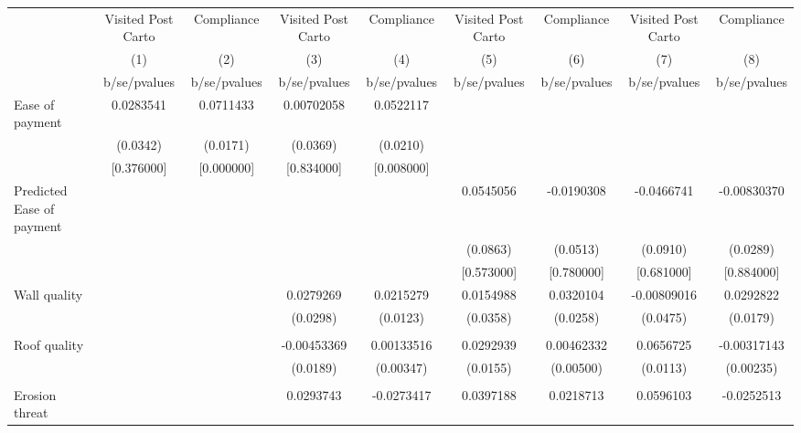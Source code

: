 {
\def\sym#1{\ifmmode^{#1}\else\(^{#1}\)\fi}
\begin{tabular}{l*{8}{c}}
\toprule
                &\multicolumn{1}{c}{Visited Post Carto}&\multicolumn{1}{c}{Compliance}&\multicolumn{1}{c}{Visited Post Carto}&\multicolumn{1}{c}{Compliance}&\multicolumn{1}{c}{Visited Post Carto}&\multicolumn{1}{c}{Compliance}&\multicolumn{1}{c}{Visited Post Carto}&\multicolumn{1}{c}{Compliance}\\
                &\multicolumn{1}{c}{(1)}&\multicolumn{1}{c}{(2)}&\multicolumn{1}{c}{(3)}&\multicolumn{1}{c}{(4)}&\multicolumn{1}{c}{(5)}&\multicolumn{1}{c}{(6)}&\multicolumn{1}{c}{(7)}&\multicolumn{1}{c}{(8)}\\
                &b/se/pvalues&b/se/pvalues&b/se/pvalues&b/se/pvalues&b/se/pvalues&b/se/pvalues&b/se/pvalues&b/se/pvalues\\
\midrule
Ease of payment &0.0283541&0.0711433&0.00702058&0.0522117&         &         &         &         \\
                & (0.0342)& (0.0171)& (0.0369)& (0.0210)&         &         &         &         \\
                &[0.376000]&[0.000000]&[0.834000]&[0.008000]&         &         &         &         \\
Predicted Ease of payment&         &         &         &         &0.0545056&-0.0190308&-0.0466741&-0.00830370\\
                &         &         &         &         & (0.0863)& (0.0513)& (0.0910)& (0.0289)\\
                &         &         &         &         &[0.573000]&[0.780000]&[0.681000]&[0.884000]\\
Wall quality    &         &         &0.0279269&0.0215279&0.0154988&0.0320104&-0.00809016&0.0292822\\
                &         &         & (0.0298)& (0.0123)& (0.0358)& (0.0258)& (0.0475)& (0.0179)\\
                &         &         &         &         &         &         &         &         \\
Roof quality    &         &         &-0.00453369&0.00133516&0.0292939&0.00462332&0.0656725&-0.00317143\\
                &         &         & (0.0189)&(0.00347)& (0.0155)&(0.00500)& (0.0113)&(0.00235)\\
                &         &         &         &         &         &         &         &         \\
Erosion threat  &         &         &0.0293743&-0.0273417&0.0397188&0.0218713&0.0596103&-0.0252513\\

\end{tabular}}
